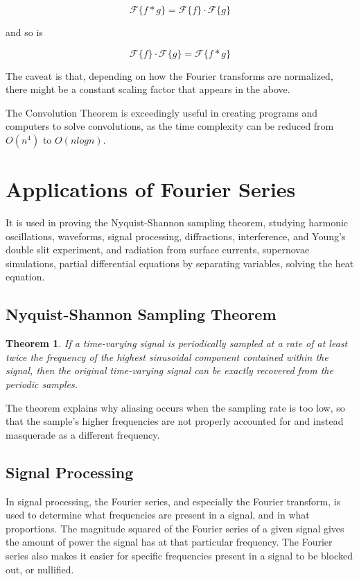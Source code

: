 \documentclass{article}
\newtheorem{theorem}{Theorem}
\begin{document}
$$\mathcal{F}\{f*g\} = \mathcal{F}\{f\} \cdot \mathcal{F}\{g\}$$

and so is 

$$\mathcal{F}\{f\} \cdot \mathcal{F}\{g\} = \mathcal{F}\{f*g\}$$

The caveat is that, depending on how the Fourier transforms are normalized, there might be a constant scaling factor that appears in the above. \cite{BerkConvolution}

The Convolution Theorem is exceedingly useful in creating programs and computers to solve convolutions, as the time complexity can be reduced from $O(n^4)$ to $O(nlogn)$.\cite{Convolution}

\section{Applications of Fourier Series}
It is used in proving the Nyquist-Shannon sampling theorem,
studying harmonic oscillations, waveforms, signal processing,
diffractions, interference, and Young's double slit experiment,
and radiation from surface currents, supernovae simulations,
partial differential equations by separating variables,
solving the heat equation.

\subsection{Nyquist-Shannon Sampling Theorem}
\begin{theorem}
	If a time-varying signal is periodically sampled at a rate of at least twice the frequency of the highest sinusoidal component contained within the signal, then the original time-varying signal can be exactly recovered from the periodic samples.\cite{Nyquist}
\end{theorem}
The theorem explains why aliasing occurs when the sampling rate is too low, so that the sample's higher frequencies are not properly accounted for and instead masquerade as a different frequency.
\subsection{Signal Processing}
In signal processing, the Fourier series, and especially the Fourier transform, is used to determine what frequencies are present in a signal, and in what proportions. The magnitude squared of the Fourier series of a given signal gives the amount of power the signal has at that particular frequency. The Fourier series also makes it easier for specific frequencies present in a signal to be blocked out, or nullified.\cite{FourierHeatSignal}\cite{WikiFourier}
\end{document}
